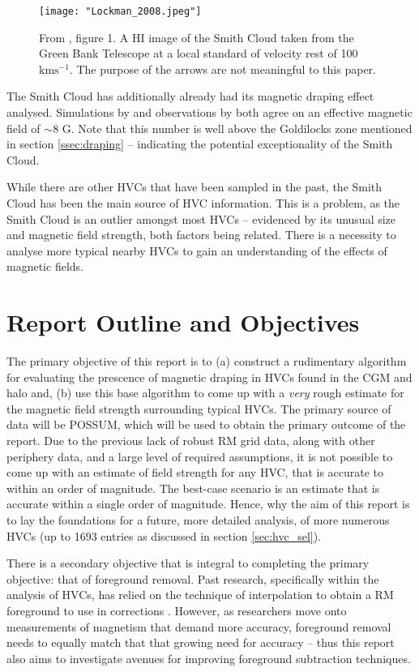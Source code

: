 \begin{figure}
    \texttt{[image: "Lockman\_2008.jpeg"]}
    \centering
    \caption{From \cite{ID28}, figure 1. A HI image of the Smith Cloud taken from the Green Bank Telescope at a local standard of velocity rest of 100 $\mathrm{kms^{-1}}$. The purpose of the arrows are not meaningful to this paper.}
    \label{fig:sc}
\end{figure}


The Smith Cloud has additionally already had its magnetic draping effect analysed. Simulations by \cite{ID23} and observations by \cite{ID26} both agree on an effective magnetic field of $\sim$8 {\textmu}G. Note that this number is well above the Goldilocks zone mentioned in section \ref{ssec:draping} – indicating the potential exceptionality of the Smith Cloud.


While there are other HVCs that have been sampled in the past, the Smith Cloud has been the main source of HVC information. This is a problem, as the Smith Cloud is an outlier amongst most HVCs – evidenced by its unusual size and magnetic field strength, both factors being related. There is a necessity to analyse more typical nearby HVCs to gain an understanding of the effects of magnetic fields.

\section{Report Outline and Objectives}
\label{sec:outline}

The primary objective of this report is to (a) construct a rudimentary algorithm for evaluating the prescence of magnetic draping in HVCs found in the CGM and halo and, (b) use this base algorithm to come up with a \textit{very} rough estimate for the magnetic field strength surrounding typical HVCs. The primary source of data will be POSSUM, which will be used to obtain the primary outcome of the report. Due to the previous lack of robust RM grid data, along with other periphery data, and a large level of required assumptions, it is not possible to come up with an estimate of field strength for any HVC, that is accurate to within an order of magnitude. The best-case scenario is an estimate that is accurate within a single order of magnitude. Hence, why the aim of this report is to lay the foundations for a future, more detailed analysis, of more numerous HVCs (up to 1693 entries as discussed in section \ref{sec:hvc_sel}).


There is a secondary objective that is integral to completing the primary objective: that of foreground removal. Past research, specifically within the analysis of HVCs, has relied on the technique of interpolation to obtain a RM foreground to use in corrections \citep{ID21, ID3, ID26}. However, as researchers move onto measurements of magnetism that demand more accuracy, foreground removal needs to equally match that that growing need for accuracy – thus this report also aims to investigate avenues for improving foreground subtraction techniques.


